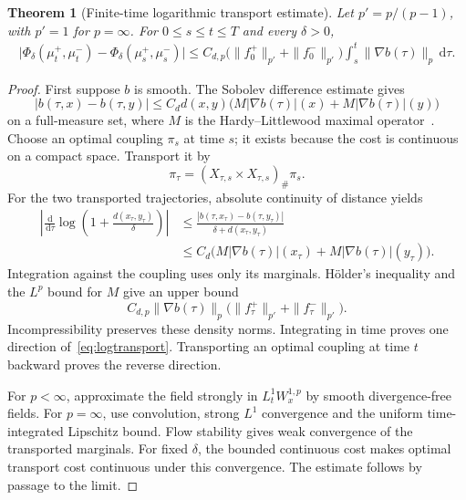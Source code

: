 \documentclass[review,12pt,times,a4paper,nopreprintline]{elsarticle}
\theoremstyle{plain}
\newtheorem{theorem}{Theorem}[section]
\theoremstyle{definition}
\theoremstyle{remark}
\newcommand{\dd}{\,\mathrm d}
\numberwithin{equation}{section}
\begin{document}
\begin{theorem}[Finite-time logarithmic transport estimate]\label{thm:logtransport}
Let $p'=p/(p-1)$, with $p'=1$ for $p=\infty$. For $0\leq s\leq t\leq T$ and every $\delta>0$,
\begin{equation}\label{eq:logtransport}
 \begin{split}
 \bigl|\Phi_\delta(\mu_t^+,\mu_t^-)-\Phi_\delta(\mu_s^+,\mu_s^-)\bigr|
 \leq C_{d,p}\bigl(\|f_0^+\|_{p'}+\|f_0^-\|_{p'}\bigr)
 \int_s^t\|\nabla b(\tau)\|_p\dd\tau.
 \end{split}
\end{equation}
\end{theorem}
\begin{proof}
First suppose $b$ is smooth. The Sobolev difference estimate gives
\begin{equation}\label{eq:hajlasz}
 |b(\tau,x)-b(\tau,y)|
 \leq C_d d(x,y)\bigl(M|\nabla b(\tau)|(x)+M|\nabla b(\tau)|(y)\bigr)
\end{equation}
on a full-measure set, where $M$ is the Hardy--Littlewood maximal operator~\cite{CrippaDeLellis}. Choose an optimal coupling $\pi_s$ at time $s$; it exists because the cost is continuous on a compact space. Transport it by
\[
 \pi_\tau=(X_{\tau,s}\times X_{\tau,s})_\#\pi_s.
\]
For the two transported trajectories, absolute continuity of distance yields
\begin{align*}
 \left|\frac{\dd}{\dd\tau}\log\left(1+\frac{d(x_\tau,y_\tau)}\delta\right)\right|
 &\leq\frac{|b(\tau,x_\tau)-b(\tau,y_\tau)|}{\delta+d(x_\tau,y_\tau)}\\
 &\leq C_d\bigl(M|\nabla b(\tau)|(x_\tau)+M|\nabla b(\tau)|(y_\tau)\bigr).
\end{align*}
Integration against the coupling uses only its marginals. H\"older's inequality and the $L^p$ bound for $M$ give an upper bound
\[
 C_{d,p}\|\nabla b(\tau)\|_p
 \bigl(\|f_\tau^+\|_{p'}+\|f_\tau^-\|_{p'}\bigr).
\]
Incompressibility preserves these density norms. Integrating in time proves one direction of~\eqref{eq:logtransport}. Transporting an optimal coupling at time $t$ backward proves the reverse direction.

For $p<\infty$, approximate the field strongly in $L^1_tW^{1,p}_x$ by smooth divergence-free fields. For $p=\infty$, use convolution, strong $L^1$ convergence and the uniform time-integrated Lipschitz bound. Flow stability gives weak convergence of the transported marginals. For fixed $\delta$, the bounded continuous cost makes optimal transport cost continuous under this convergence. The estimate follows by passage to the limit.
\end{proof}
\end{document}
